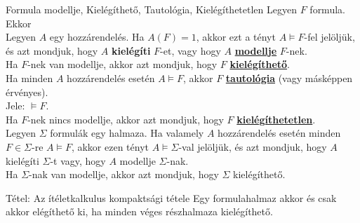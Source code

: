 \documentclass{beamer}
\begin{document}
\begin{frame}

\begin{block}{Formula modellje, Kielégíthető, Tautológia, Kielégíthetetlen}
Legyen $F$ formula. Ekkor\\
\bigskip
Legyen $A$ egy hozzárendelés. Ha $A(F) = 1$, akkor ezt a tényt $A \models F$-fel jelöljük, és azt mondjuk, hogy $A$ \textbf{kielégíti} $F$-et, vagy hogy $A$ \underline{\textbf{modellje}} $F$-nek.\\
\bigskip
Ha $F$-nek van modellje, akkor azt mondjuk, hogy $F$ \underline{\textbf{kielégíthető}}.\\
\bigskip
Ha minden $A$ hozzárendelés esetén $A \models F$, akkor $F$ \underline{\textbf{tautológia}} (vagy másképpen érvényes).\\
Jele: $\models F$.\\
\bigskip
Ha $F$-nek nincs modellje, akkor azt mondjuk, hogy $F$ \underline{\textbf{kielégíthetetlen}}.\\
\bigskip
Legyen $\Sigma$ formulák egy halmaza. Ha valamely $A$ hozzárendelés esetén minden $F \in \Sigma$-re $A \models F$, akkor ezen tényt $A \models \Sigma$-val jelöljük, és azt mondjuk, hogy $A$ kielégíti $\Sigma$-t vagy, hogy $A$ modellje $\Sigma$-nak.\\
\bigskip
Ha $\Sigma$-nak van modellje, akkor azt mondjuk, hogy $\Sigma$ kielégíthető.
\end{block}

\end{frame}

\begin{frame}

\begin{block}{Tétel: Az ítéletkalkulus kompaktsági tétele}
Egy formulahalmaz akkor és csak akkor elégíthető ki, ha minden véges részhalmaza kielégíthető.

\end{block}

\end{frame}
\end{document}

